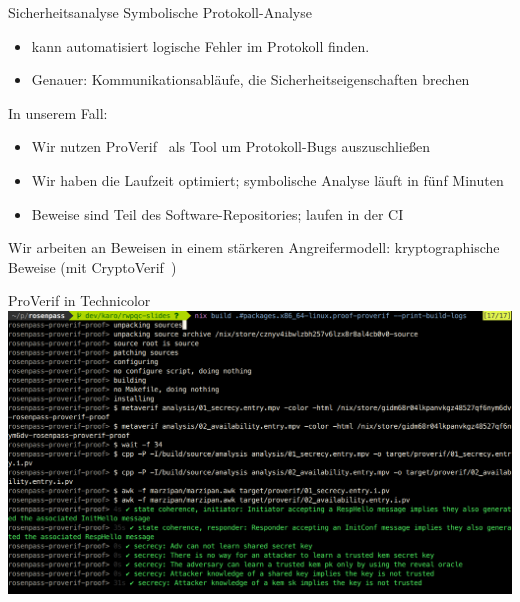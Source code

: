 \documentclass{rosenpass-beamer}
\begin{document}
\begin{frame}{Sicherheitsanalyse}
  Symbolische Protokoll-Analyse
	\begin{itemize}
		\item kann automatisiert logische Fehler im Protokoll finden.
		\item Genauer: Kommunikationsabläufe, die Sicherheitseigenschaften brechen
\end{itemize}

In unserem Fall:
  \begin{itemize}
    \item Wir nutzen ProVerif~\cite{proverif} als Tool um Protokoll-Bugs auszuschließen
    \item Wir haben die Laufzeit optimiert; symbolische Analyse läuft in fünf Minuten
    \item Beweise sind Teil des Software-Repositories; laufen in der CI
  \end{itemize}

	Wir arbeiten an Beweisen in einem stärkeren Angreifermodell: kryptographische Beweise (mit CryptoVerif~\cite{cryptoverif})
\end{frame}

\begin{frame}{ProVerif in Technicolor}
  \includegraphics[height=.9\textheight]{assets/2023-03-20-symbolic-analysis-screenshot.png}
\end{frame}
\end{document}
